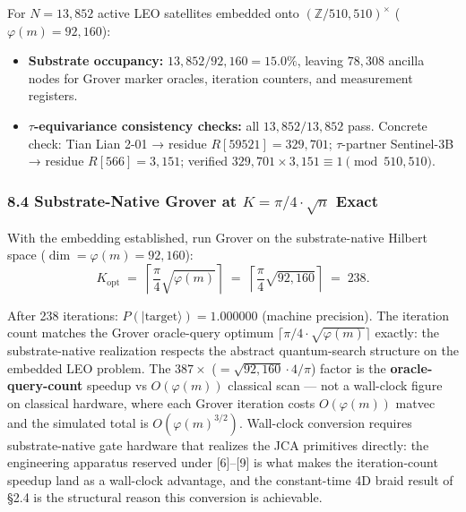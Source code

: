 \documentclass[
]{article}
\providecommand{\tightlist}{%
  \setlength{\itemsep}{0pt}\setlength{\parskip}{0pt}}
\begin{document}
For \(N = 13{,}852\) active LEO satellites embedded onto
\((\mathbb{Z}/510{,}510)^\times\) (\(\varphi(m) = 92{,}160\)):

\begin{itemize}
\tightlist
\item
  \textbf{Substrate occupancy:} \(13{,}852 / 92{,}160 = 15.0\%\),
  leaving \(78{,}308\) ancilla nodes for Grover marker oracles,
  iteration counters, and measurement registers.
\item
  \textbf{\(\tau\)-equivariance consistency checks:} all
  \(13{,}852 / 13{,}852\) pass. Concrete check: Tian Lian 2-01 → residue
  \(R[59521] = 329{,}701\); \(\tau\)-partner Sentinel-3B → residue
  \(R[566] = 3{,}151\); verified
  \(329{,}701 \times 3{,}151 \equiv 1 \pmod{510{,}510}\).
\end{itemize}

\subsubsection{\texorpdfstring{8.4 Substrate-Native Grover at
\(K = \pi/4 \cdot \sqrt{n}\)
Exact}{8.4 Substrate-Native Grover at K = \textbackslash pi/4 \textbackslash cdot \textbackslash sqrt\{n\} Exact}}\label{substrate-native-grover-at-k-pi4-cdot-sqrtn-exact}

With the embedding established, run Grover on the substrate-native
Hilbert space (\(\dim = \varphi(m) = 92{,}160\)):
\[K_\text{opt} \;=\; \left\lceil \frac{\pi}{4} \sqrt{\varphi(m)} \right\rceil \;=\; \left\lceil \frac{\pi}{4} \sqrt{92{,}160} \right\rceil \;=\; 238. \tag{8.1}\]

After 238 iterations: \(P(|\text{target}\rangle) = 1.000000\) (machine
precision). The iteration count matches the Grover oracle-query optimum
\(\lceil\pi/4 \cdot \sqrt{\varphi(m)}\rceil\) exactly: the
substrate-native realization respects the abstract quantum-search
structure on the embedded LEO problem. The \(387\times\)
(\(= \sqrt{92{,}160} \cdot 4/\pi\)) factor is the
\textbf{oracle-query-count} speedup vs \(O(\varphi(m))\) classical scan
--- not a wall-clock figure on classical hardware, where each Grover
iteration costs \(O(\varphi(m))\) matvec and the simulated total is
\(O(\varphi(m)^{3/2})\). Wall-clock conversion requires substrate-native
gate hardware that realizes the JCA primitives directly: the engineering
apparatus reserved under {[}6{]}--{[}9{]} is what makes the
iteration-count speedup land as a wall-clock advantage, and the
constant-time 4D braid result of §2.4 is the structural reason this
conversion is achievable.
\end{document}
